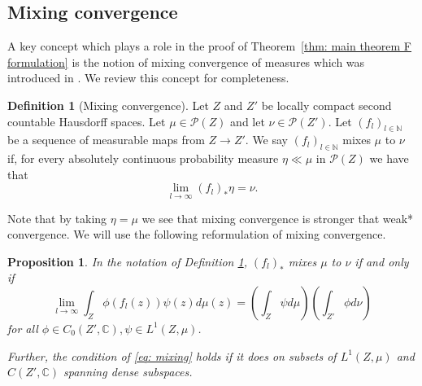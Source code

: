 \documentclass[reqno,11pt, twoside]{amsart}
\theoremstyle{plain}
\newtheorem{prop}[thm]{Proposition}
\theoremstyle{definition}
\newtheorem{defn}[thm]{Definition}
\theoremstyle{definition}
\theoremstyle{remark}
\numberwithin{equation}{section}
\newcommand\ca[1]{\mathcal{#1}}
\newcommand{\Co}{{\mathbb{C}}}
\newcommand{\N}{{\mathbb{N}}}
\begin{document}
\subsection{Mixing convergence}\label{sec: mixing abstract}
A key concept which plays a role in the proof of Theorem~\ref{thm: main theorem F formulation} is 
the notion of mixing convergence of measures which was introduced in \cite[Definition 4.1]{GDV}. We review this concept for completeness.
\begin{defn}[Mixing convergence]\label{defn: mixing}
    Let $Z$ and $Z'$ be locally compact second countable Hausdorff spaces. Let $\mu \in \ca{P}(Z)$ and let $\nu \in \ca{P}(Z')$. Let $(f_l)_{l \in \N}$ be a sequence of measurable maps from $Z \to Z'$.
     We say $(f_l)_{l \in \N}$ mixes $\mu$ to $\nu$ if, for every absolutely continuous probability measure $ \eta \ll \mu$ in $\ca{P}(Z)$ we have that
    \begin{equation}\label{eq: mixing conv}
        \lim_{l \to \infty} (f_l)_* \eta =\nu.
    \end{equation}
\end{defn}
Note that by taking $\eta=\mu$ we see that mixing convergence is stronger that
weak* convergence. 
We will use the following reformulation of mixing convergence.
\begin{prop}\label{prop: mixing functions}
In the notation of Definition \ref{defn: mixing}, $(f_l)_*$ mixes $\mu$ to $\nu$ if and only if
\begin{equation}\label{eq: mixing}
    \lim_{l \to \infty} \int_{Z} \phi(f_l(z)) \psi(z) d\mu(z) = \left(\int_{Z} \psi d\mu \right) \left(\int_{Z'}\phi d\nu \right) 
\end{equation}
for all $\phi \in C_0(Z',\Co), \psi \in L^1(Z,\mu)$.

Further, the condition of \eqref{eq: mixing} holds if it does on subsets of $L^1(Z,\mu)$ and $C(Z',\Co)$ spanning dense subspaces.
\end{prop}
\end{document}
